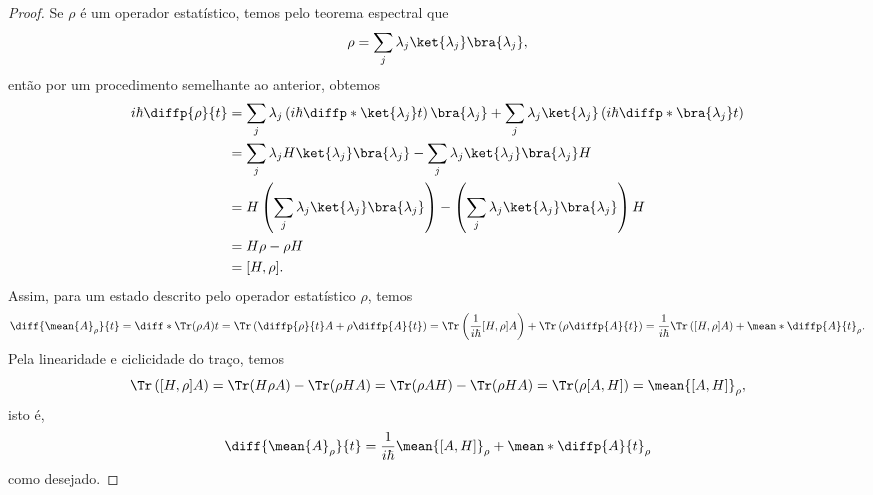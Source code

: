 \begin{proof}
   Se \(\rho\) é um operador estatístico, temos pelo teorema espectral que
   \begin{equation*}
      \rho = \sum_{j} \lambda_j \ket{\lambda_j}\bra{\lambda_j},
   \end{equation*}
   então por um procedimento semelhante ao anterior, obtemos
   \begin{align*}
      i \hbar \diffp{\rho}{t} &= \sum_{j} \lambda_j \left(i \hbar \diffp*{\ket{\lambda_j}}{t}\right)\bra{\lambda_j} + \sum_{j} \lambda_j \ket{\lambda_j} \left(i \hbar \diffp*{\bra{\lambda_j}}{t}\right)\\
                             &= \sum_{j} \lambda_j H \ket{\lambda_j}\bra{\lambda_j} - \sum_{j} \lambda_j \ket{\lambda_j}\bra{\lambda_j}H\\
                             &= H \left(\sum_{j} \lambda_j \ket{\lambda_j}\bra{\lambda_j}\right) - \left(\sum_j \lambda_j \ket{\lambda_j}\bra{\lambda_j}\right) H\\
                             &= H \rho - \rho H\\
                             &= [H, \rho].
   \end{align*}
   Assim, para um estado descrito pelo operador estatístico \(\rho\), temos
   \begin{equation*}
      \diff{\mean{A}_\rho}{t} = \diff*{\Tr(\rho A)}{t} = \Tr\left(\diffp{\rho}{t}A + \rho \diffp{A}{t}\right) = \Tr\left(\frac{1}{i \hbar}[H, \rho]A\right) + \Tr\left(\rho \diffp{A}{t}\right) = \frac{1}{i \hbar} \Tr\left([H,\rho]A\right) + \mean*{\diffp{A}{t}}_\rho.
   \end{equation*}
   Pela linearidade e ciclicidade do traço, temos
   \begin{equation*}
      \Tr\left([H, \rho]A\right) = \Tr(H\rho A) - \Tr(\rho H A) = \Tr(\rho A H) - \Tr(\rho H A) = \Tr(\rho [A, H]) = \mean{[A, H]}_\rho,
   \end{equation*}
   isto é,
   \begin{equation*}
       \diff{\mean{A}_\rho}{t} = \frac{1}{i \hbar} \mean{[A, H]}_\rho + \mean*{\diffp{A}{t}}_\rho
   \end{equation*}
   como desejado.
\end{proof}


